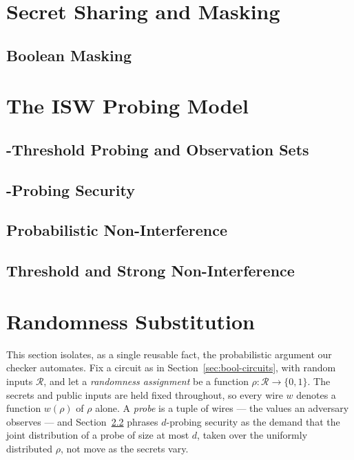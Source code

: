 \section{Secret Sharing and Masking}
\label{sec:secret-sharing}
  \subsection{Boolean Masking}
  \label{sec:boolean-masking}
\section{The ISW Probing Model}
\label{sec:isw-model}
  \subsection{-Threshold Probing and Observation Sets}
  \label{sec:t-threshold}
  \subsection{-Probing Security}
  \label{sec:d-probing}
  \subsection{Probabilistic Non-Interference}
  \label{sec:pni}
  \subsection{Threshold and Strong Non-Interference}
  \label{sec:sni}
\section{Randomness Substitution}
\label{sec:randomness-substitution}

This section isolates, as a single reusable fact, the probabilistic argument
our checker automates. Fix a circuit as in Section~\ref{sec:bool-circuits},
with random inputs $\mathcal{R}$, and let a \emph{randomness assignment} be a
function $\rho : \mathcal{R} \to \{0,1\}$. The secrets and public inputs are
held fixed throughout, so every wire $w$ denotes a function $w(\rho)$ of $\rho$
alone. A \emph{probe} is a tuple of wires --- the values an adversary observes
--- and Section~\ref{sec:d-probing} phrases $d$-probing security as the demand
that the joint distribution of a probe of size at most $d$, taken over the
uniformly distributed $\rho$, not move as the secrets vary.


